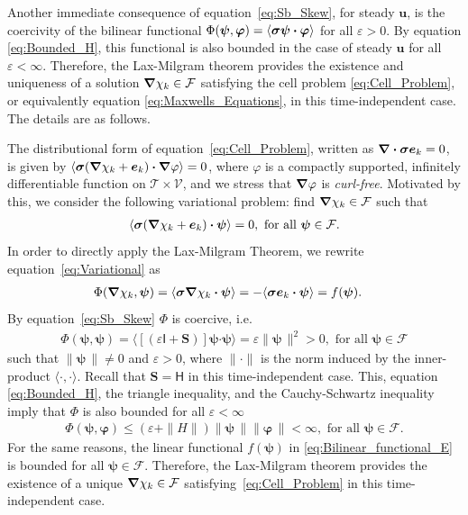 \documentclass[leqno,onefignum,onetabnum]{siamltex1213}
\newcommand{\Sb}{\mathbf{S}}
\newcommand{\Tc}{\mathcal{T}}
\newcommand{\Vc}{\mathcal{V}}
\newcommand{\Fc}{\mathcal{F}}
\newcommand{\Hm}{\mathsf{H}}
\newcommand{\Ib}{\mathsf{I}}
\newcommand\bsig{\mbox{\boldmath${\sigma}$}}
\newcommand\bnabla{\mbox{\boldmath${\nabla}$}}
\providecommand\bcdot{\boldsymbol{\cdot}}
\newcommand{\vecu}{\boldsymbol{u}}
\newcommand{\vece}{\boldsymbol{e}}
\newcommand{\vecpsi}{\boldsymbol{\psi}}
\newcommand{\vecvarphi}{\boldsymbol{\varphi}}
\begin{document}
Another immediate consequence of equation~\eqref{eq:Sb_Skew}, for
steady $\vecu $, is the coercivity of the bilinear functional
$\Phi(\vecpsi,\vecvarphi)=\langle\bsig\vecpsi\bcdot\vecvarphi\rangle$ for all $\varepsilon>0$. By equation
\eqref{eq:Bounded_H}, this functional is also bounded in the case of
steady $\vecu $ for all $\varepsilon<\infty$. Therefore, the Lax-Milgram theorem
\cite{McOwen:2003:PDE} provides the existence and uniqueness of a
solution $\bnabla \chi_k\in\Fc$ satisfying the cell problem
\eqref{eq:Cell_Problem}, or equivalently equation
\eqref{eq:Maxwells_Equations}, in this time-independent case. The
details are as follows. 




The distributional form of equation~\eqref{eq:Cell_Problem}, written
as $\bnabla \bcdot\bsig\vece _k=0$, is given by
$\langle\bsig(\bnabla \chi_k+\vece _k)\bcdot\bnabla \varphi\rangle=0$, where $\varphi$ is a compactly
supported, infinitely differentiable function on $\Tc\times\Vc$, and we
stress that $\bnabla \varphi$ is \emph{curl-free}. Motivated by this, we
consider the following variational problem: find $\bnabla \chi_k\in\Fc$ such
that   
%
\begin{align}\label{eq:Variational}
  \langle\bsig(\bnabla \chi_k+\vece _k)\bcdot\vecpsi\rangle=0, \text{ for all }
  \vecpsi\in\Fc.
\end{align}
%
In order to directly apply the Lax-Milgram Theorem, we rewrite
equation~\eqref{eq:Variational} as 
%
\begin{align}  \label{eq:Bilinear_functional_E} 
   &\Phi(\bnabla \chi_k,\vecpsi)
     =\langle\bsig\bnabla \chi_k\bcdot\vecpsi\rangle
     =-\langle\bsig\vece_k\bcdot\vecpsi\rangle
     =f(\vecpsi). 
\end{align}
%
By equation~\eqref{eq:Sb_Skew} $\Phi$ is coercive, i.e.
%
\begin{align}\label{eq:Phi_Coercive}
  \Phi(\vecpsi,\vecpsi)=\langle[(\varepsilon\Ib+\Sb)]\vecpsi\bcdot\vecpsi\rangle=\varepsilon\|\vecpsi\,\|^2>0,
   \text{ for all } \vecpsi\in\Fc
\end{align}
%
such that $\|\vecpsi\,\|\neq0$ and $\varepsilon>0$, where $\|\cdot\|$
is the norm induced by the inner-product $\langle\cdot,\cdot\rangle$. Recall that
$\Sb=\Hm$ in this time-independent case. This, equation 
\eqref{eq:Bounded_H}, the triangle inequality,
and the Cauchy-Schwartz inequality imply that $\Phi$ is also bounded for
all $\varepsilon<\infty$
%
\begin{align}\label{eq:Phi_Bounded}
  \Phi(\vecpsi,\vecvarphi)\leq(\varepsilon+\|H\|)\|\vecpsi\,\|\|\vecvarphi\,\|<\infty,
  \text{ for all } \vecpsi\in\Fc.
\end{align}
%
For the same reasons, the linear functional $f(\vecpsi)$ in
\eqref{eq:Bilinear_functional_E} is bounded for all
$\vecpsi\in\Fc$. Therefore, the Lax-Milgram theorem
\cite{McOwen:2003:PDE} provides the existence of a unique
$\bnabla \chi_k\in\Fc$ satisfying~\eqref{eq:Cell_Problem} in this
time-independent case. 
\end{document}
